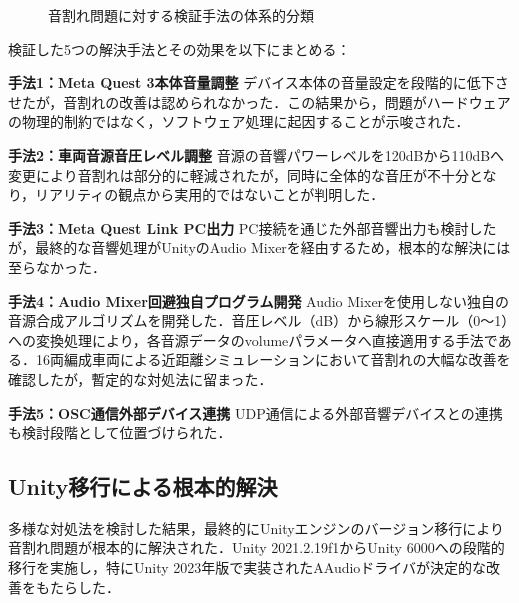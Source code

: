 \documentclass[10pt]{jsarticle}
\begin{document}
\begin{figure}[h]
\caption{音割れ問題に対する検証手法の体系的分類}
\label{fig:audio_distortion_solutions}
\end{figure}

検証した5つの解決手法とその効果を以下にまとめる：

\textbf{手法1：Meta Quest 3本体音量調整}
デバイス本体の音量設定を段階的に低下させたが，音割れの改善は認められなかった．この結果から，問題がハードウェアの物理的制約ではなく，ソフトウェア処理に起因することが示唆された．

\textbf{手法2：車両音源音圧レベル調整}
音源の音響パワーレベルを120dBから110dBへ変更により音割れは部分的に軽減されたが，同時に全体的な音圧が不十分となり，リアリティの観点から実用的ではないことが判明した．

\textbf{手法3：Meta Quest Link PC出力}
PC接続を通じた外部音響出力も検討したが，最終的な音響処理がUnityのAudio Mixerを経由するため，根本的な解決には至らなかった．

\textbf{手法4：Audio Mixer回避独自プログラム開発}
Audio Mixerを使用しない独自の音源合成アルゴリズムを開発した．音圧レベル（dB）から線形スケール（0〜1）への変換処理により，各音源データのvolumeパラメータへ直接適用する手法である．16両編成車両による近距離シミュレーションにおいて音割れの大幅な改善を確認したが，暫定的な対処法に留まった．

\textbf{手法5：OSC通信外部デバイス連携}
UDP通信による外部音響デバイスとの連携も検討段階として位置づけられた．

\subsection{Unity移行による根本的解決}
多様な対処法を検討した結果，最終的にUnityエンジンのバージョン移行により音割れ問題が根本的に解決された．Unity 2021.2.19f1からUnity 6000への段階的移行を実施し，特にUnity 2023年版で実装されたAAudioドライバが決定的な改善をもたらした．
\end{document}
